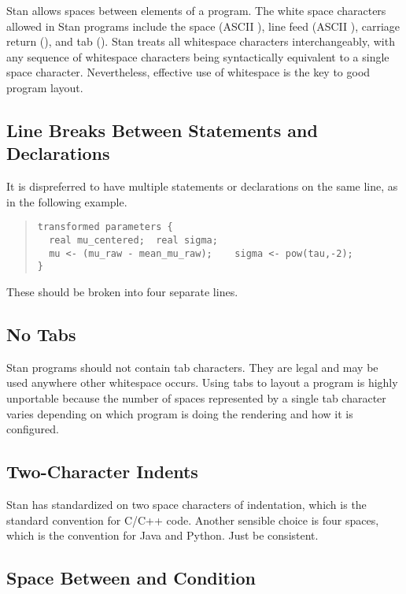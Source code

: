 Stan allows spaces between elements of a program.  The white space
characters allowed in Stan programs include the space (ASCII
), line feed (ASCII ), carriage return
(), and tab ().  Stan treats all whitespace
characters interchangeably, with any sequence of whitespace characters
being syntactically equivalent to a single space character.
Nevertheless, effective use of whitespace is the key to good program
layout.


\subsection{Line Breaks Between Statements and Declarations}

It is dispreferred to have multiple statements or declarations on the
same line, as in the following example.
%
\begin{quote}
\begin{Verbatim}
transformed parameters {
  real mu_centered;  real sigma;
  mu <- (mu_raw - mean_mu_raw);    sigma <- pow(tau,-2);
}
\end{Verbatim}
\end{quote}
%
These should be broken into four separate lines.

\subsection{No Tabs}

Stan programs should not contain tab characters.  They are legal and
may be used anywhere other whitespace occurs.  Using tabs to layout a
program is highly unportable because the number of spaces
represented by a single tab character varies depending on which
program is doing the rendering and how it is configured.  

\subsection{Two-Character Indents}

Stan has standardized on two space characters of indentation, which is
the standard convention for C/C++ code.  Another sensible choice is
four spaces, which is the convention for Java and Python.  Just be
consistent.  

\subsection{Space Between  and Condition}

